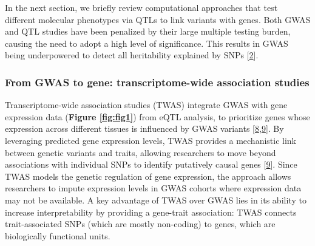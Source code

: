 In the next section, we briefly review computational approaches that test different molecular phenotypes via QTLs to link variants with genes.
Both GWAS and QTL studies have been penalized by their large multiple testing burden, causing the need to adopt a high level of significance.
This results in GWAS being underpowered to detect all heritability explained by SNPs {[}\protect\hyperlink{ref-17B4AigZT}{2}{]}.

\hypertarget{from-gwas-to-gene-transcriptome-wide-association-studies}{%
\subsubsection{From GWAS to gene: transcriptome-wide association studies}\label{from-gwas-to-gene-transcriptome-wide-association-studies}}

Transcriptome-wide association studies (TWAS) integrate GWAS with gene expression data (\textbf{Figure \ref{fig:fig1}}) from eQTL analysis, to prioritize genes whose expression across different tissues is influenced by GWAS variants {[}\protect\hyperlink{ref-ReOPt75u}{8},\protect\hyperlink{ref-l6ogswV3}{9}{]}.
By leveraging predicted gene expression levels, TWAS provides a mechanistic link between genetic variants and traits, allowing researchers to move beyond associations with individual SNPs to identify putatively causal genes {[}\protect\hyperlink{ref-l6ogswV3}{9}{]}.
Since TWAS models the genetic regulation of gene expression, the approach allows researchers to impute expression levels in GWAS cohorts where expression data may not be available.
A key advantage of TWAS over GWAS lies in its ability to increase interpretability by providing a gene-trait association: TWAS connects trait-associated SNPs (which are mostly non-coding) to genes, which are biologically functional units.

